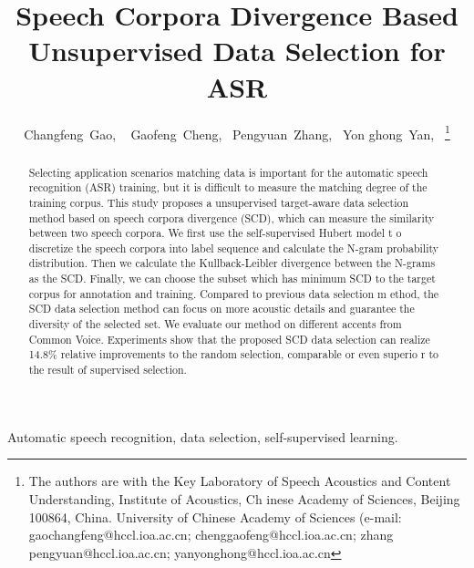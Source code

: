  
\importpackages{}
\graphicspath{ {./images/} }

\title{Speech Corpora Divergence Based Unsupervised Data Selection for ASR}
\author{Changfeng~Gao,
~
        Gaofeng~Cheng,~
        Pengyuan~Zhang,~
        Yon
ghong~Yan,~
\thanks{The authors are with the Key Laboratory of Speech Acoustics and Content Understanding, Institute of Acoustics, Ch
inese Academy of Sciences,
Beijing 100864, China. University of Chinese Academy of Sciences (e-mail: gaochangfeng@hccl.ioa.ac.cn;  chenggaofeng@hccl.ioa.ac.cn; zhang
pengyuan@hccl.ioa.ac.cn; yanyonghong@hccl.ioa.ac.cn}
}
\maketitle
\begin{abstract}
Selecting application scenarios matching data is important for the automatic 
speech recognition (ASR) training, but it is difficult to measure the matching degree of the training corpus.
This study proposes a unsupervised target-aware data selection method based on speech corpora divergence (SCD), which can measure the similarity between two speech corpora.
We first use the self-supervised Hubert model t
o discretize the speech corpora into label sequence and calculate the N-gram probability distribution. 
Then we calculate the Kullback-Leibler divergence between the
 N-grams as the SCD.
Finally, we can choose the subset which has minimum SCD to the target corpus for annotation and training.
Compared to previous data selection m
ethod, the SCD data selection method can focus on more acoustic details and guarantee the diversity of the selected set.
We evaluate our method on different accents 
from Common Voice. Experiments show that the proposed SCD data selection can realize 14.8\% relative improvements to the random selection, comparable or even superio
r to the result of supervised selection.
\end{abstract}
\begin{IEEEkeywords}
Automatic speech recognition, data selection, self-supervised learning.
\end{IEEEkeywords}
